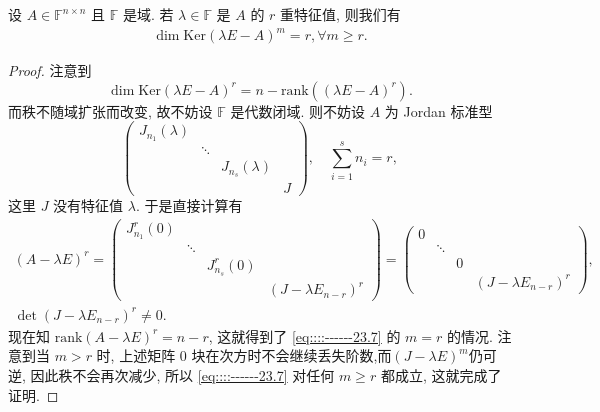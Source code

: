 \documentclass[../../main.tex]{subfiles}%
\begin{document}
\begin{lemma}[根子空间维数]\label{lemma:根子空间维数}
设 \( A \in \mathbb{F}^{n \times n} \) 且 \( \mathbb{F} \) 是域. 若 \( \lambda \in \mathbb{F} \) 是 \( A \) 的 \( r \) 重特征值, 则我们有
\begin{align}
\dim \mathrm{Ker} \left( \lambda E - A \right)^m = r, \forall m \geqslant r. \label{eq::::------23.7}
\end{align}
\end{lemma}
\begin{proof}
注意到
\[
\dim \mathrm{Ker} \left( \lambda E - A \right)^r = n - \mathrm{rank} \left( \left( \lambda E - A \right)^r \right).
\]
而秩不随域扩张而改变, 故不妨设 \( \mathbb{F} \) 是代数闭域. 则不妨设 \( A \) 为 Jordan 标准型
\[
\begin{pmatrix}
J_{n_1} \left( \lambda \right) & & & \\
& \ddots & & \\
& & J_{n_s} \left( \lambda \right) & \\
& & & J
\end{pmatrix}, \quad \sum_{i=1}^s n_i = r,
\]
这里 \( J \) 没有特征值 \( \lambda \). 于是直接计算有
\begin{gather*}
\left( A - \lambda E \right)^r = \begin{pmatrix}
J_{n_1}^r \left( 0 \right) & & & \\
& \ddots & & \\
& & J_{n_s}^r \left( 0 \right) & \\
& & & \left( J - \lambda E_{n-r} \right)^r
\end{pmatrix} = \begin{pmatrix}
0 & & & \\
& \ddots & & \\
& & 0 & \\
& & & \left( J - \lambda E_{n-r} \right)^r
\end{pmatrix}, 
\\
\det \left( J - \lambda E_{n-r} \right)^r \neq 0.
\end{gather*}
现在知 \( \mathrm{rank} \left( A - \lambda E \right)^r = n - r \), 这就得到了 \eqref{eq::::------23.7} 的 \( m = r \) 的情况. 注意到当 \( m > r \) 时, 上述矩阵 \( 0 \) 块在次方时不会继续丢失阶数,而$\left( J - \lambda E \right)^m$仍可逆, 因此秩不会再次减少, 所以 \eqref{eq::::------23.7} 对任何 \( m \geqslant r \) 都成立, 这就完成了证明.
\end{proof}
\end{document}

